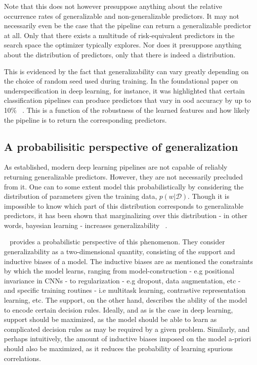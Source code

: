 	Note that this does not however presuppose anything about the relative occurrence rates of generalizable and non-generalizable predictors. It may not necessarily even be the case that the pipeline can return a generalizable predictor at all. Only that there exists a multitude of risk-equivalent predictors in the search space the optimizer typically explores. Nor does it presuppose anything about the distribution of predictors, only that there is indeed a distribution. 

	This is evidenced by the fact that generalizability can vary greatly depending on the choice of random seed used during training. In the foundational paper on underspecification in deep learning, for instance, it was highlighted that certain classification pipelines can produce predictors that vary in ood accuracy by up to 10\% ~\cite{damour2020underspecification}. This is a function of the robustness of the learned features and how likely the pipeline is to return the corresponding predictors. 
	
	\subsection{A probabilisitic perspective of generalization} \label{probpersp}
	As established, modern deep learning pipelines are not capable of reliably returning generalizable predictors. However, they are not necessarily precluded from it. One can to some extent model this probabilistically by considering the distribution of parameters given the training data, \(p(w | \mathcal{D})\). Though it is impossible to know which part of this distribution corresponds to generalizable predictors, it has been shown that marginalizing over this distribution - in other words, bayesian learning - increases generalizability ~\cite{bayesian_generalization,endoensemble,divergentnets,ensemble_machinereading}. 

	~\cite{bayesian_generalization} provides a probabilistic perspective of this phenomenon. They consider generalizability as a two-dimensional quantity, consisting of the support and inductive biases of a model. The inductive biases are as mentioned the constraints by which the model learns, ranging from model-construction - e.g positional invariance in CNNs - to regularization - e.g dropout, data augmentation, etc - and specific training routines - i.e multitask learning, contrastive representation learning, etc. The support, on the other hand, describes the ability of the model to encode certain decision rules. Ideally, and as is the case in deep learning, support should be maximized, as the model should be able to learn as complicated decision rules as may be required by a given problem. Similarly, and perhaps intuitively, the amount of inductive biases imposed on the model a-priori should also be maximized, as it reduces the probability of learning spurious correlations. 

